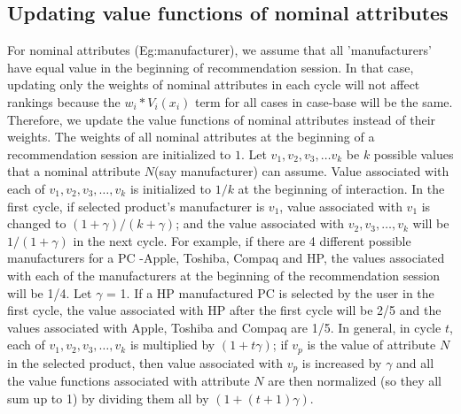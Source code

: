 \subsection{Updating value functions of nominal attributes}
\label{sec:valueFunc}
For nominal attributes (Eg:manufacturer), we assume that all 'manufacturers' have equal value in the beginning of recommendation session.
In that case, updating only the weights of nominal attributes in each cycle will not affect rankings because the $w_i*V_i(x_i)$ term for all cases in case-base will be the same.
Therefore, we update the value functions of nominal attributes instead of their weights.
The weights of all nominal attributes at the beginning of a recommendation session are initialized to $1$.
Let $v_1, v_2, v_3,\hdots v_k$ be $k$ possible values that a nominal attribute $N$(say manufacturer) can assume.
Value associated with each of $v_1, v_2, v_3,\hdots, v_k$ is initialized to $1/k$ at the beginning of interaction.
In the first cycle, if selected product's manufacturer is $v_1$, value associated with $v_1$ is changed to $(1+\gamma)/(k+\gamma)$; and the value associated with $v_2, v_3, \hdots, v_k$ will be $1/(1+\gamma)$ in the next cycle.
For example, if there are 4 different possible manufacturers for a PC -Apple, Toshiba, Compaq and HP, the values associated with each of the manufacturers at the beginning of the recommendation session will be 1/4.
Let $\gamma$ = 1.
If a HP manufactured PC is selected by the user in the first cycle, the value associated with HP after the first cycle will be 2/5 and the values associated with Apple, Toshiba and Compaq are 1/5.
In general, in cycle $t$,  each of $v_1, v_2, v_3,\hdots, v_k$ is multiplied by $(1 + t\gamma)$; if $v_p$ is the value of attribute $N$ in the selected product, then value associated with $v_p$ is increased by $\gamma$ and all the value functions associated with attribute $N$ are then normalized (so they all sum up to 1)  by dividing them all by $(1+ (t+1)\gamma)$.


%
%





